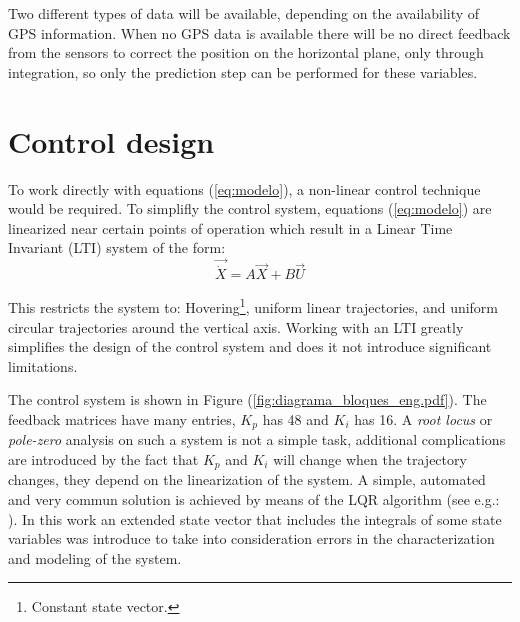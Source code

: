 \documentclass[conference]{IEEEtran}
\newcommand{\refp}[1]{(\ref{#1})}
\begin{document}
Two different types of data will be available, depending on the availability of GPS information. When no GPS data is available there will be no direct feedback from the sensors to correct the position on the horizontal plane, only through integration, so only the prediction step can be performed for these variables.


\section{Control design}
\label{sec:control}

To work directly with equations \refp{eq:modelo}, a non-linear control technique would be required. To simplifly the control system, equations \refp{eq:modelo} are linearized near certain points of operation which result in a Linear Time Invariant (LTI) system of the form:
\begin{equation}
  \label{eq:lti}
  \vec{\dot{X}} = A\vec{X} + B\vec{U}
\end{equation}

This restricts the system to: Hovering\footnote{Constant state vector.}, uniform linear trajectories, and uniform circular trajectories around the vertical axis. Working with an LTI greatly simplifies the design of the control system and does it not introduce significant limitations.

The control system is shown in Figure \refp{fig:diagrama_bloques_eng.pdf}. The feedback matrices have many entries, $K_p$ has 48 and $K_i$ has 16. A \textit{root locus} or \textit{pole-zero} analysis on such a system is not a simple task, additional complications are introduced by the fact that $K_p$ and $K_i$ will change when the trajectory changes, they depend on the linearization of the system. A simple, automated and very commun solution is achieved by means of the LQR algorithm (see e.g.: \cite{bib:lqr-discreto}). In this work an extended state vector that includes the integrals of some state variables was introduce to take into consideration errors in the characterization and modeling of the system.
\end{document}
